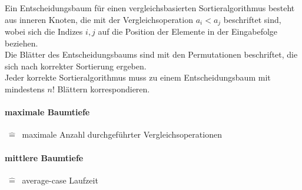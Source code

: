 Ein Entscheidungsbaum für einen vergleichsbasierten Sortieralgorithmus besteht aus inneren Knoten, die mit der Vergleichsoperation $a_i < a_j$ beschriftet sind, wobei sich die Indizes $i,j$ auf die Position der Elemente in der Eingabefolge beziehen.\\
Die Blätter des Entscheidungsbaums sind mit den Permutationen beschriftet, die sich nach korrekter Sortierung ergeben.\\
Jeder korrekte Sortieralgorithmus muss zu einem Entscheidungsbaum mit mindestens $n!$ Blättern korrespondieren.\\
\paragraph{maximale Baumtiefe} $~\hat{=}~$ maximale Anzahl durchgeführter Vergleichsoperationen\\
\paragraph{mittlere Baumtiefe} $~\hat{=}~$ average-case Laufzeit
